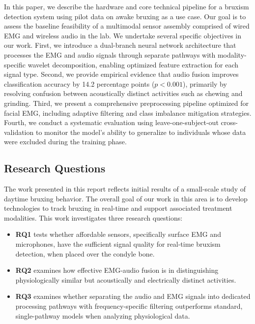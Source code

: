\documentclass[pdflatex,sn-vancouver-num, iicol]{sn-jnl}
\begin{document}
 In this paper, we describe the hardware and core technical pipeline for a bruxism detection system using pilot data on awake bruxing as a use case. Our goal is to assess the baseline feasibility of a multimodal sensor assembly comprised of wired EMG and wireless audio in the lab. We undertake several specific objectives in our work. First, we introduce a dual-branch neural network architecture that processes the EMG and audio signals through separate pathways with modality-specific wavelet decomposition, enabling optimized feature extraction for each signal type. Second, we provide empirical evidence that audio fusion improves classification accuracy by 14.2 percentage points ($p < 0.001$), primarily by resolving confusion between acoustically distinct activities such as chewing and grinding. Third, we present a comprehensive preprocessing pipeline optimized for facial EMG, including adaptive filtering and class imbalance mitigation strategies. Fourth, we conduct a systematic evaluation using leave-one-subject-out cross-validation to monitor the model's ability to generalize to individuals whose data were excluded during the training phase.



\subsection{Research Questions}

The work presented in this report reflects initial results of a small-scale study of daytime bruxing behavior. The overall goal of our work in this area is to develop technologies to track bruxing in real-time and support associated treatment modalities. This work investigates three research questions:

\begin{itemize}
    \item \textbf{RQ1} tests whether affordable sensors, specifically surface EMG and microphones, have the sufficient signal quality for real-time bruxism detection, when placed over the condyle bone.
    \item \textbf{RQ2} examines how effective EMG-audio fusion is in distinguishing physiologically similar but acoustically and electrically distinct activities.%
    \item \textbf{RQ3} examines whether separating the audio and EMG signals into dedicated processing pathways with frequency-specific filtering outperforms standard, single-pathway models when analyzing physiological data.  
\end{itemize}
\end{document}
